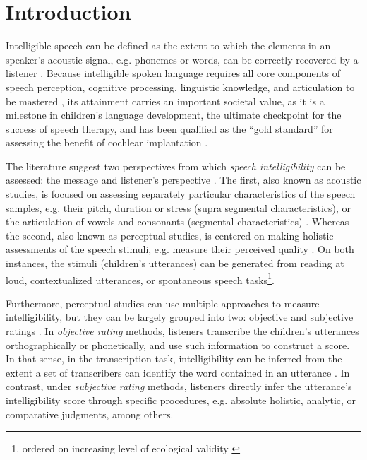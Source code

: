 \section{Introduction} \label{S:introduction}

Intelligible speech can be defined as the extent to which the elements in an speaker's acoustic signal, e.g. phonemes or words, can be correctly recovered by a listener \citep{Kent_et_al_1989, Whitehill_et_al_2004, vanHeuven_2008, Freeman_et_al_2017}. Because intelligible spoken language requires all core components of speech perception, cognitive processing, linguistic knowledge, and articulation to be mastered \citep{Freeman_et_al_2017}, its attainment carries an important societal value, as it is a milestone in children's language development, the ultimate checkpoint for the success of speech therapy, and has been qualified as the ``gold standard'' for assessing the benefit of cochlear implantation \citep{Chin_et_al_2012}. 

The literature suggest two perspectives from which \textit{speech intelligibility} can be assessed: the message and listener's perspective \citep{Boonen_et_al_2020, Boonen_et_al_2021}. The first, also known as acoustic studies, is focused on assessing separately particular characteristics of the speech samples, e.g. their pitch, duration or stress (supra segmental characteristics), or the articulation of vowels and consonants (segmental characteristics) \citep{Rowe_et_al_2018}. Whereas the second, also known as perceptual studies, is centered on making holistic assessments of the speech stimuli, e.g. measure their perceived quality \citep{Boonen_et_al_2020, Boonen_et_al_2021}. On both instances, the stimuli (children's utterances) can be generated from reading at loud, contextualized utterances, or spontaneous speech tasks\footnote{ordered on increasing level of ecological validity \citep{Flipsen_2006,Ertmer_2011}}.

\begin{comment}
Based on their description, it seems that perceptual are more subjective than acoustic studies, as they do not rely on "objective" measurements, i.e. time duration, wave amplitude, among others, available in the former. However, for the case of SI, there are objective and subjective assessment methodologies.
\end{comment}

Furthermore, perceptual studies can use multiple approaches to measure intelligibility, but they can be largely grouped into two: objective and subjective ratings \citep{Hustad_et_al_2020}. In \textit{objective rating} methods, listeners transcribe the children's utterances orthographically or phonetically, and use such information to construct a score. In that sense, in the transcription task, intelligibility can be inferred from the extent a set of transcribers can identify the word contained in an utterance \cite{Boonen_et_al_2021}. In contrast, under \textit{subjective rating} methods, listeners directly infer the utterance's intelligibility score through specific procedures, e.g. absolute holistic, analytic, or comparative judgments, among others. 

